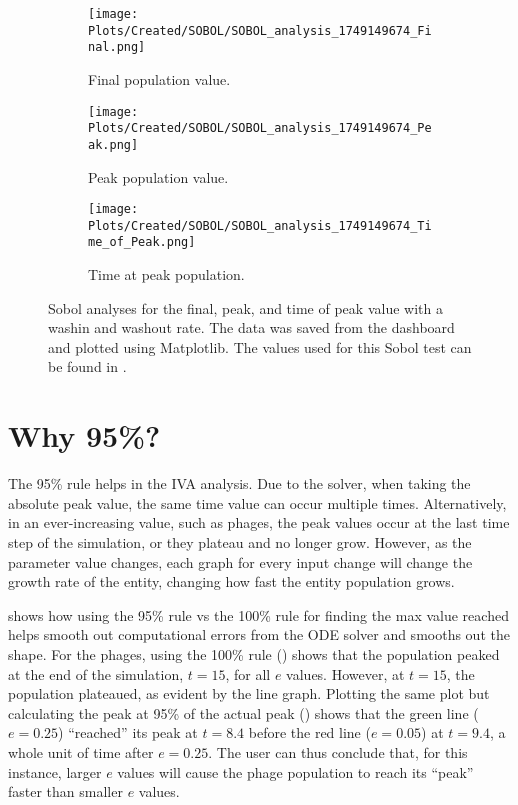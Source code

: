 \begin{figure}[ht!]
    \centering
    \begin{subfigure}{0.32\linewidth}
        \centering
        \captionsetup{width=1\linewidth}
        \texttt{[image: Plots/Created/SOBOL/SOBOL\_analysis\_1749149674\_Final.png]}
        \caption{
            Final population value. 
        }
        \label{fig:created:Sobol_final}
    \end{subfigure}
    \hfill
    \begin{subfigure}{0.32\linewidth}
        \centering
        \captionsetup{width=1\linewidth}
        \texttt{[image: Plots/Created/SOBOL/SOBOL\_analysis\_1749149674\_Peak.png]}
        \caption{
            Peak population value. 
        }
        \label{fig:created:Sobol_peak}
    \end{subfigure}
    \hfill
    \begin{subfigure}{0.32\linewidth}
        \centering
        \captionsetup{width=1\linewidth}
        \texttt{[image: Plots/Created/SOBOL/SOBOL\_analysis\_1749149674\_Time\_of\_Peak.png]}
        \caption{
            Time at peak population. 
        }
        \label{fig:created:Sobol_peak_time}
    \end{subfigure}
    \caption{
            Sobol analyses for the final, peak, and time of peak value with a washin and washout rate. 
            The data was saved from the dashboard and plotted using Matplotlib. 
            The values used for this Sobol test can be found in . 
        }
    \label{fig:created:Sobol_analyses}
\end{figure}

\section{Why 95\%?}
\label{sec:appendixF:why_95}
The 95\% rule helps in the IVA analysis. 
Due to the solver, when taking the absolute peak value, the same time value can occur multiple times. 
Alternatively, in an ever-increasing value, such as phages, the peak values occur at the last time step of the simulation, or they plateau and no longer grow. 
However, as the parameter value changes, each graph for every input change will change the growth rate of the entity, changing how fast the entity population grows. 

 shows how using the 95\% rule vs the 100\% rule for finding the max value reached helps smooth out computational errors from the ODE solver and smooths out the shape. 
For the phages, using the 100\% rule () shows that the population peaked at the end of the simulation, $t=15$, for all $e$ values. 
However, at $t=15$, the population plateaued, as evident by the line graph. 
Plotting the same plot but calculating the peak at 95\% of the actual peak () shows that the green line ($e=0.25$) “reached” its peak at $t=8.4$ before the red line ($e=0.05$) at $t=9.4$, a whole unit of time after $e=0.25$. 
The user can thus conclude that, for this instance, larger $e$ values will cause the phage population to reach its “peak” faster than smaller $e$ values. 

